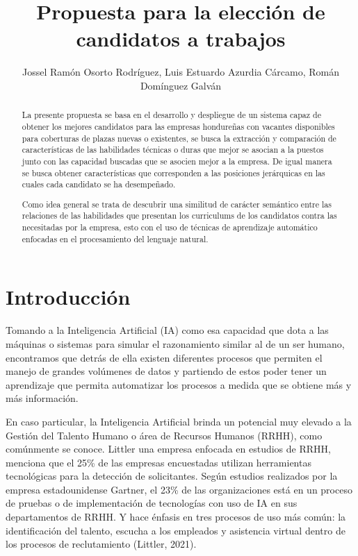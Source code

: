\documentclass[a4paper]{jpconf}
\begin{document}
\title{Propuesta para la elección de candidatos a trabajos}

\author{
Jossel Ramón Osorto Rodríguez, 
Luis Estuardo Azurdia Cárcamo, 
Román Domínguez Galván
}

\begin{abstract}
La presente propuesta se basa en el desarrollo y despliegue de un sistema capaz de obtener los mejores candidatos para las empresas hondureñas con vacantes disponibles para coberturas de plazas nuevas o existentes, se busca la extracción y comparación de características de las habilidades técnicas o duras que mejor se asocian a la puestos junto con las capacidad buscadas que se asocien mejor a la empresa.  De igual manera se busca obtener características que corresponden a las posiciones jerárquicas en las cuales cada candidato se ha desempeñado.

Como idea general se trata de descubrir una similitud de carácter semántico entre las relaciones de las habilidades que presentan los curriculums de los candidatos contra las necesitadas por la empresa, esto con el uso de técnicas de aprendizaje automático enfocadas en el procesamiento del lenguaje natural.
\end{abstract}

\section{Introducción}
Tomando a la Inteligencia Artificial (IA) como esa capacidad que dota a las máquinas o sistemas para simular el razonamiento similar al de un ser humano, encontramos que detrás de ella existen diferentes procesos que permiten el manejo de grandes volúmenes de datos y partiendo de estos poder tener un aprendizaje que permita automatizar los procesos a medida que se obtiene más y más información.

En caso particular, la Inteligencia Artificial brinda un potencial muy elevado a la Gestión del Talento Humano o área de Recursos Humanos (RRHH), como comúnmente se conoce. Littler una empresa enfocada en estudios de RRHH, menciona que el 25\% de las empresas encuestadas utilizan herramientas tecnológicas para la detección de solicitantes. Según estudios realizados por la empresa estadounidense Gartner, el 23\% de las organizaciones está en un proceso de pruebas o de implementación de tecnologías con uso de IA en sus departamentos de RRHH. Y hace énfasis en tres procesos de uso más común: la identificación del talento, escucha a los empleados y asistencia virtual dentro de los procesos de reclutamiento (Littler, 2021).
\end{document}
